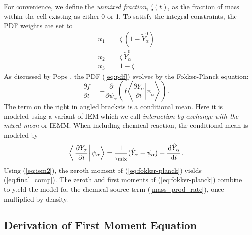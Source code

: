 For convenience, we define the \emph{unmixed fraction}, $\zeta(t)$, as the fraction of mass within the cell existing as either 0 or 1.  To satisfy the integral constraints, the PDF weights are set to
\begin{align}
w_1 &= \zeta \, (1 - \widetilde{Y}_\alpha^0) \\
w_2 &= \zeta \, \widetilde{Y}_\alpha^0 \\
w_3 &= 1-\zeta
\end{align}
As discussed by Pope \cite{Pope:2000}, the PDF (\ref{eq:pdf}) evolves by the Fokker-Planck equation:
\begin{equation}
\label{eq:fokker-planck}
\frac{\partial f}{\partial t} = -\frac{\partial}{\partial \psi_\alpha} \left(f \left\langle \left. \frac{\partial Y_\alpha}{\partial t} \right| \psi_\alpha \right\rangle \right) \,\mbox{.}
\end{equation}
The term on the right in angled brackets is a conditional mean.  Here it is modeled using a variant of IEM \cite{Dopazo:1974} which we call {\em interaction by exchange with the mixed mean} or IEMM.  When including chemical reaction, the conditional mean is modeled by
\begin{equation}
\label{eq:iem2}
\left\langle \left. \frac{\partial Y_\alpha}{\partial t} \right| \psi_\alpha \right\rangle = \frac{1}{\tau_{\si{mix}}}(\hat{Y}_\alpha - \psi_\alpha) + \frac{\d \hat{Y}_\alpha}{\d t} \,\mbox{.}
\end{equation}
Using (\ref{eq:iem2}), the zeroth moment of (\ref{eq:fokker-planck}) yields (\ref{eq:final_comp}).  The zeroth and first moments of (\ref{eq:fokker-planck}) combine to yield the model for the chemical source term (\ref{mass_prod_rate}), once multiplied by density.

\subsection*{Derivation of First Moment Equation}

